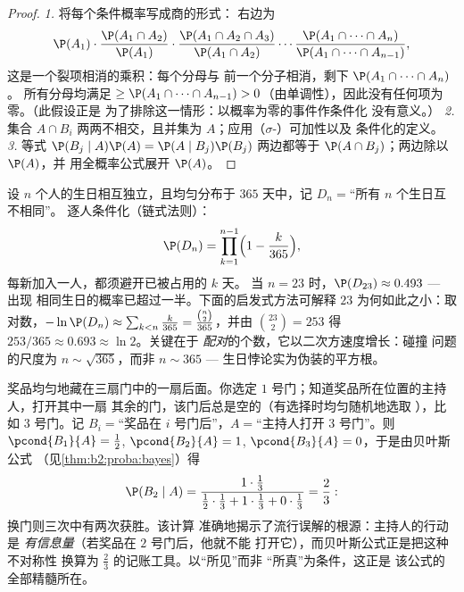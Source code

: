 \begin{proof}
\emph{1.} 将每个条件概率写成商的形式：
右边为
\[
\P(A_1)\cdot\frac{\P(A_1 \cap A_2)}{\P(A_1)}\cdot
\frac{\P(A_1 \cap A_2 \cap A_3)}{\P(A_1 \cap A_2)}\cdots
\frac{\P(A_1 \cap \dots \cap A_n)}{\P(A_1 \cap \dots \cap
A_{n-1})},
\]
这是一个裂项相消的乘积：每个分母与
前一个分子相消，剩下 $\P(A_1 \cap \dots \cap A_n)$。
所有分母均满足 $\geq \P(A_1 \cap \dots \cap A_{n-1}) >
0$（由单调性），因此没有任何项为零。（此假设正是
为了排除这一情形：以概率为零的事件作条件化
没有意义。）
\emph{2.} 集合 $A \cap B_i$ 两两不相交，且并集为
$A$；应用（$\sigma$-）可加性以及
条件化的定义。
\emph{3.} 等式 $\P(B_j \mid A)\P(A) = \P(A \mid
B_j)\P(B_j)$ 两边都等于 $\P(A \cap B_j)$；两边除以 $\P(A)$，并
用全概率公式展开 $\P(A)$。
\end{proof}

\begin{example}\label{ex:b2:proba:birthday}
设 $n$ 个人的生日相互独立，且均匀分布于
$365$ 天中，记 $D_n = {}$“所有 $n$ 个生日互不相同”。
逐人条件化（链式法则）：
\[
\P(D_n) = \prod_{k=1}^{n-1}\Bigl(1 - \frac{k}{365}\Bigr),
\]
每新加入一人，都须避开已被占用的 $k$ 天。
当 $n = 23$ 时，$\P(D_{23}) \approx 0.493$ --- 出现
相同生日的概率已超过一半。下面的启发式方法可解释
$23$ 为何如此之小：取对数，$-\ln
\P(D_n) \approx \sum_{k<n}\frac k{365} =
\frac{\binom n2}{365}$，并由 $\binom{23}2 = 253$ 得
$253/365 \approx 0.693 \approx \ln 2$。关键在于
\emph{配对}的个数，它以二次方速度增长：碰撞
问题的尺度为 $n \sim \sqrt{365}$，而非 $n \sim
365$ --- 生日悖论实为伪装的平方根。
\end{example}

\begin{example}\label{ex:b2:proba:montyhall}
奖品均匀地藏在三扇门中的一扇后面。你选定
$1$ 号门；知道奖品所在位置的主持人，打开其中一扇
其余的门，该门后总是空的（有选择时均匀随机地选取
），比如 $3$ 号门。记 $B_i = {}$“奖品在
$i$ 号门后”，$A = {}$“主持人打开 $3$ 号门”。则
$\pcond{B_1}{A} = \frac12$, $\pcond{B_2}{A} = 1$,
$\pcond{B_3}{A} = 0$，于是由贝叶斯公式
（见\cref{thm:b2:proba:bayes}）得
\[
\P(B_2 \mid A)
= \frac{1\cdot\frac13}
{\frac12\cdot\frac13 + 1\cdot\frac13 + 0\cdot\frac13}
= \frac23 :
\]
换门则三次中有两次获胜。该计算
准确地揭示了流行误解的根源：主持人的行动是
\emph{有信息量}（若奖品在 $2$ 号门后，他就不能
打开它），而贝叶斯公式正是把这种不对称性
换算为 $\frac23$ 的记账工具。以“所见”而非
“所真”为条件，这正是
该公式的全部精髓所在。
\end{example}

